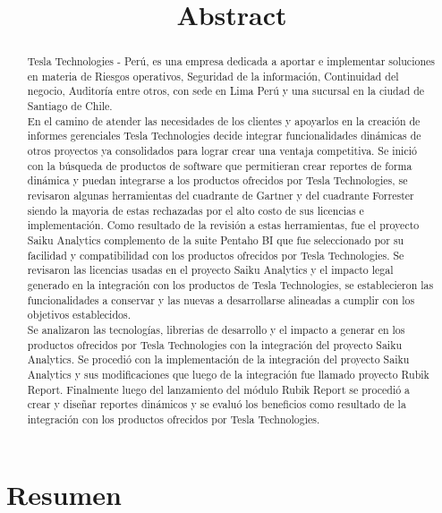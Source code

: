 \chapter*{Resumen}
\begin{titlepage}
	\title{Abstract}
	\begin{abstract}
		\singlespacing	
		Tesla Technologies - Perú, es una empresa dedicada a aportar e implementar soluciones en materia de Riesgos operativos, Seguridad de la información, Continuidad del negocio, Auditoría entre otros, con sede en Lima Perú y una sucursal en la ciudad de Santiago de Chile.\\
		
		\onehalfspacing
		En el camino de atender las necesidades de los clientes y apoyarlos en la creación de informes gerenciales Tesla Technologies decide integrar funcionalidades dinámicas de otros proyectos ya consolidados para lograr crear una ventaja competitiva.
		Se inició con la búsqueda de productos de software que permitieran crear reportes de forma dinámica y puedan integrarse a los productos ofrecidos por Tesla Technologies, se revisaron algunas herramientas del cuadrante de Gartner y del cuadrante Forrester siendo la mayoria de estas rechazadas por el alto costo de sus licencias e implementación. 
		Como resultado de la revisión a estas herramientas, fue el proyecto Saiku Analytics complemento de la suite Pentaho BI  que fue seleccionado por su facilidad y compatibilidad con los productos ofrecidos por Tesla Technologies.
		Se revisaron las licencias usadas en el proyecto Saiku Analytics y el impacto legal generado en la integración con los productos de Tesla Technologies, se establecieron las funcionalidades a conservar y las nuevas a desarrollarse alineadas a cumplir con los objetivos establecidos.\\
		
		\doublespacing
		Se analizaron las tecnologías, librerias de desarrollo y el impacto a generar en los productos ofrecidos por Tesla Technologies con la integración del proyecto Saiku Analytics.
		Se procedió con la implementación de la integración del proyecto Saiku Analytics y sus modificaciones que luego de la integración fue llamado proyecto Rubik Report.
		Finalmente luego del lanzamiento del módulo Rubik Report se procedió a crear y diseñar reportes dinámicos y se evaluó los beneficios como resultado de la integración con los productos ofrecidos por Tesla Technologies.\\
	\end{abstract}
	\maketitle
\end{titlepage}
